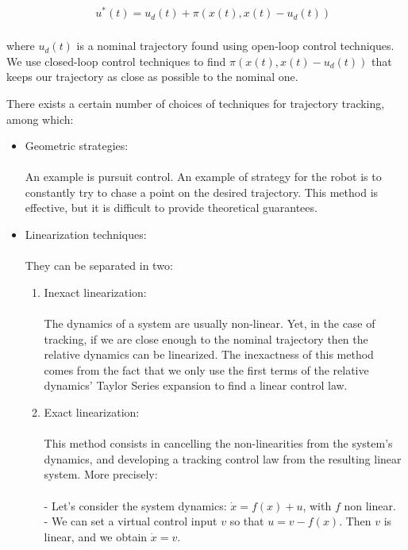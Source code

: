 \documentclass[twoside]{article}
\begin{document}
\begin{equation} \label{constrained}
\begin{split}
\: \: &u^*(t) = u_d(t) + \pi(x(t), x(t)-u_d(t)) \\
\end{split}
\end{equation}

where $u_d(t)$ is a nominal trajectory found using open-loop control techniques. We use closed-loop control techniques to find $\pi(x(t), x(t)-u_d(t))$ that keeps our trajectory as close as possible to the nominal one.

There exists a certain number of choices of techniques for trajectory tracking, among which:

\begin{itemize}
  \item Geometric strategies: \\
  \\ An example is pursuit control. An example of strategy for the robot is to constantly try to chase a point on the desired trajectory. This method is effective, but it is difficult to provide theoretical guarantees.
  \item Linearization techniques: \\
  \\ They can be separated in two:
  \begin{enumerate}
    \item Inexact linearization: \\
    \\
    The dynamics of a system are usually non-linear. Yet, in the case of tracking, if we are close enough to the nominal trajectory then the relative dynamics can be linearized. The inexactness of this method comes from the fact that we only use the first terms of the relative dynamics' Taylor Series expansion to find a linear control law.
    \\
    \item Exact linearization: \\
    \\
    This method consists in cancelling the non-linearities from the system's dynamics, and developing a tracking control law from the resulting linear system. More precisely: \\
    \\
    - Let's consider the system dynamics: $\dot{x} = f(x) + u$, with $f$ non linear.\\
     - We can set a virtual control input $v$ so that $u = v - f(x)$. Then $v$ is linear, and we obtain $\dot{x} = v$. \\

\end{enumerate}
\end{itemize}
\end{document}
